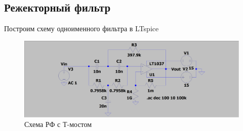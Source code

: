 \documentclass[a4paper, 12pt]{article}
\begin{document}
    \subsection{Режекторный фильтр}
    Построим схему одноименного фильтра в LTspice
    \begin{figure}[H]
        \centering
        \includegraphics[scale=0.22]{scheme5.png}
        \captionsetup{skip=0pt}
        \caption{Схема РФ с Т-мостом}
        \label{fig:scheme5}
    \end{figure}
\end{document}
